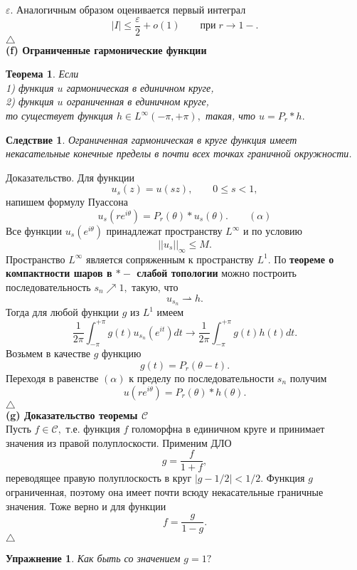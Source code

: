 \documentclass[12 pt, a4 paper]{article}
\theoremstyle{plain}   \newtheorem{Pro}{Задача}
\newtheorem{The}{Теорема}
\newtheorem{Cor}{Следствие}
\newtheorem{Exe}{Упражнение}
\begin{document}
$ \varepsilon . $
Аналогичным образом оценивается первый интеграл
$$
  |I| \leq \frac{\varepsilon }{2} + o (1)
  \qquad при \; r \rightarrow 1- .
$$
$ \triangle $
\\
{\bfseries (f) Ограниченные гармонические функции}
\begin{The}
Если\\
1) функция
$ u $
гармоническая в единичном круге, \\
2) функция
$ u $
ограниченная в единичном круге, \\
то существует функция
$ h \in L^{\infty}(-\pi , +\pi ), $
такая, что
$ u=P_r \ast h . $
\end{The}
\begin{Cor}
Ограниченная гармоническая в круге функция имеет некасательные
конечные пределы в почти всех точках граничной окружности.
\end{Cor}
{\Large Доказательство.}
Для функции
$$
  u_s (z)=u(sz), \qquad 0 \leq s <1,
$$
напишем формулу Пуассона
$$
  u_s (re^{i\theta})=P_r (\theta ) \ast u_s (\theta ).
  \qquad ( \alpha )
$$
Все функции
$ u_s (e^{i\theta} ) $
принадлежат пространству
$ L^{\infty} $
и по условию
$$
  ||u_s ||_{\infty} \leq M.
$$
Пространство
$ L^{\infty} $
является сопряженным к пространству
$ L^1 . $
По
{\bfseries теореме о компактности шаров в
$ \ast - $
слабой топологии}
можно построить последовательность
$ s_n \nearrow 1 , $
такую, что
$$
  u_{s_n} \rightharpoonup h.
$$
Тогда для любой функции
$ g $
из
$ L^1 $
имеем
$$
  \frac{1}{2\pi}\int _{-\pi}^{+\pi}
  g(t)u_{s_n}(e^{it})dt \longrightarrow
  \frac{1}{2\pi}\int _{-\pi}^{+\pi}
  g(t)h(t)dt.
$$
Возьмем в качестве
$ g $
функцию
$$
  g(t)=P_r (\theta -t).
$$
Переходя в равенстве
$ (\alpha ) $
к пределу по последовательности
$ s_n $
получим
$$
  u(re^{i\theta})=P_r (\theta ) \ast h(\theta ).
$$
$ \triangle $
\\
{\bfseries (g) Доказательство теоремы
$ \mathcal{C} $ }
\\
Пусть
$ f \in \mathcal{C} , $
т.е. функция
$ f $
голоморфна в единичном круге и принимает значения из
правой полуплоскости. Применим ДЛО
$$
  g=\frac{f}{1+f},
$$
переводящее правую полуплоскость в круг
$ |g-1/2|<1/2. $
Функция
$ g $
ограниченная, поэтому она имеет почти всюду некасательные
граничные значения. Тоже верно и для функции
$$
  f=\frac{g}{1-g}.
$$
$ \triangle $
\begin{Exe}
Как быть со значением
$ g=1 ? $
\end{Exe}
\newpage
\end{document}
